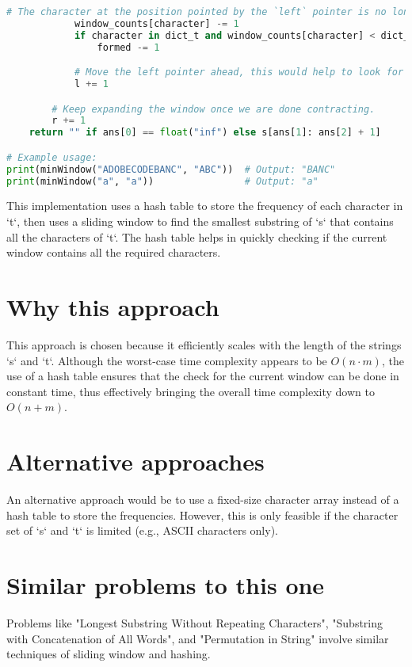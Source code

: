 \begin{fullwidth}
\begin{lstlisting}[language=Python]
            # The character at the position pointed by the `left` pointer is no longer a part of the window.
            window_counts[character] -= 1
            if character in dict_t and window_counts[character] < dict_t[character]:
                formed -= 1

            # Move the left pointer ahead, this would help to look for a new window.
            l += 1    

        # Keep expanding the window once we are done contracting.
        r += 1    
    return "" if ans[0] == float("inf") else s[ans[1]: ans[2] + 1]

# Example usage:
print(minWindow("ADOBECODEBANC", "ABC"))  # Output: "BANC"
print(minWindow("a", "a"))                # Output: "a"
\end{lstlisting}

\end{fullwidth}

This implementation uses a hash table to store the frequency of each character in `t`, then uses a sliding window to find the smallest substring of `s` that contains all the characters of `t`. The hash table helps in quickly checking if the current window contains all the required characters.

\section*{Why this approach}
This approach is chosen because it efficiently scales with the length of the strings `s` and `t`. Although the worst-case time complexity appears to be \(O(n \cdot m)\), the use of a hash table ensures that the check for the current window can be done in constant time, thus effectively bringing the overall time complexity down to \(O(n + m)\).

\section*{Alternative approaches}
An alternative approach would be to use a fixed-size character array instead of a hash table to store the frequencies. However, this is only feasible if the character set of `s` and `t` is limited (e.g., ASCII characters only).

\section*{Similar problems to this one}
Problems like "Longest Substring Without Repeating Characters", "Substring with Concatenation of All Words", and "Permutation in String" involve similar techniques of sliding window and hashing.

